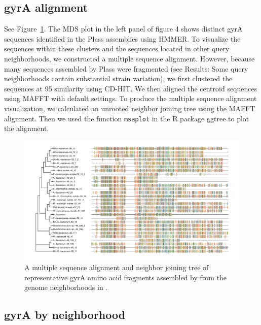\subsection{gyrA alignment}
\label{subsec:gyrAalign}

See Figure~\ref{fig:gyrAalign}. The MDS plot in the left panel of figure 4 shows
distinct gyrA sequences identified in the Plass assemblies using HMMER. To visualize
the sequences within these clusters and the sequences located in other query 
neighborhoods, we constructed a multiple sequence alignment. However, because many
sequences assembled by Plass were fragmented (see Results: Some query neighborhoods
contain substantial strain variation), we first clustered the sequences at 95%
similarity using CD-HIT. We then aligned the centroid sequences using MAFFT with 
default settings. To produce the multiple sequence alignment visualization, we 
calculated an unrooted neighbor joining tree using the MAFFT alignment. Then we used
the function {\tt msaplot} in the R package ggtree to plot the alignment.  

\begin{figure}
 \centering
 \includegraphics[width=\linewidth]{figures/gyrA-cdhit95-msa}
	\caption{A multiple sequence alignment and neighbor joining tree of representative gyrA amino acid fragments assembled by \plass from the genome neighborhoods in \hu.
 }
 \label{fig:gyrAalign}
\end{figure}

\subsection{gyrA by neighborhood}
\label{subsec:gyrAnbhd}

